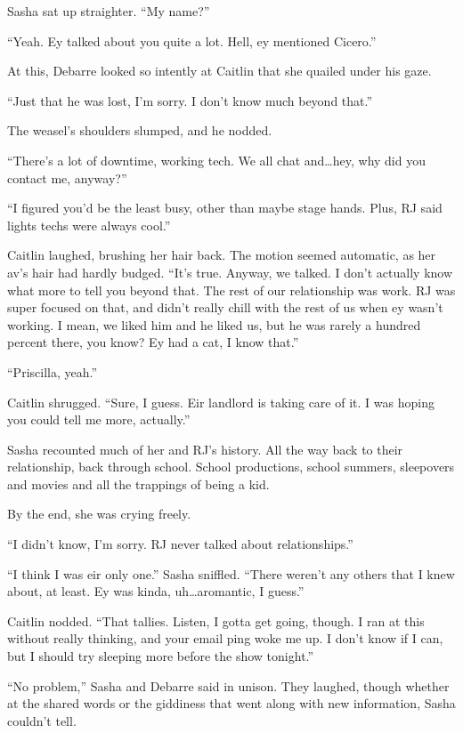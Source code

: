 Sasha sat up straighter. ``My name?''

``Yeah. Ey talked about you quite a lot. Hell, ey mentioned Cicero.''

At this, Debarre looked so intently at Caitlin that she quailed under his gaze.

``Just that he was lost, I'm sorry. I don't know much beyond that.''

The weasel's shoulders slumped, and he nodded.

``There's a lot of downtime, working tech. We all chat and\ldots{}hey, why did you contact me, anyway?''

``I figured you'd be the least busy, other than maybe stage hands. Plus, RJ said lights techs were always cool.''

Caitlin laughed, brushing her hair back. The motion seemed automatic, as her av's hair had hardly budged. ``It's true. Anyway, we talked. I don't actually know what more to tell you beyond that. The rest of our relationship was work. RJ was super focused on that, and didn't really chill with the rest of us when ey wasn't working. I mean, we liked him and he liked us, but he was rarely a hundred percent there, you know? Ey had a cat, I know that.''

``Priscilla, yeah.''

Caitlin shrugged. ``Sure, I guess. Eir landlord is taking care of it. I was hoping you could tell me more, actually.''

Sasha recounted much of her and RJ's history. All the way back to their relationship, back through school. School productions, school summers, sleepovers and movies and all the trappings of being a kid.

By the end, she was crying freely.

``I didn't know, I'm sorry. RJ never talked about relationships.''

``I think I was eir only one.'' Sasha sniffled. ``There weren't any others that I knew about, at least. Ey was kinda, uh\ldots{}aromantic, I guess.''

Caitlin nodded. ``That tallies. Listen, I gotta get going, though. I ran at this without really thinking, and your email ping woke me up. I don't know if I can, but I should try sleeping more before the show tonight.''

``No problem,'' Sasha and Debarre said in unison. They laughed, though whether at the shared words or the giddiness that went along with new information, Sasha couldn't tell.

